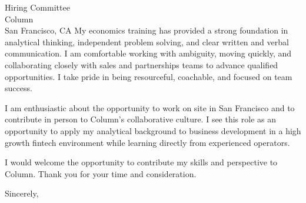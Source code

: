 \documentclass[11pt]{letter}
\begin{document}
\begin{letter}{Hiring Committee \\ Column \\ San Francisco, CA}
My economics training has provided a strong foundation in analytical thinking, independent problem solving, and clear written and verbal communication. I am comfortable working with ambiguity, moving quickly, and collaborating closely with sales and partnerships teams to advance qualified opportunities. I take pride in being resourceful, coachable, and focused on team success.

I am enthusiastic about the opportunity to work on site in San Francisco and to contribute in person to Column’s collaborative culture. I see this role as an opportunity to apply my analytical background to business development in a high growth fintech environment while learning directly from experienced operators.

I would welcome the opportunity to contribute my skills and perspective to Column. Thank you for your time and consideration.

\closing{Sincerely,}

\end{letter}
\end{document}
